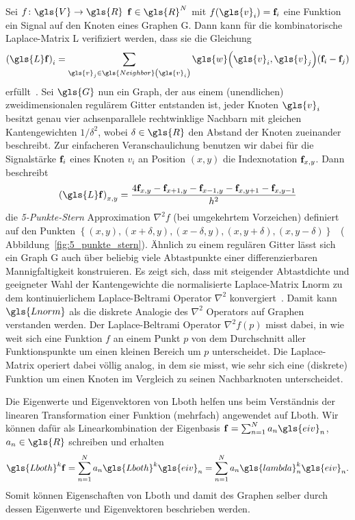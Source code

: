 Sei $f \colon \gls{V} \to \gls{R}$ \bzw{} $\ve{f} \in \gls{R}^N$ mit $f\left(\gls{v}_i\right) = \ve{f}_i$ eine Funktion \bzw{} ein Signal auf den Knoten eines Graphen \gls{G}.
Dann kann für die kombinatorische Laplace-Matrix \gls{L} verifiziert werden, dass sie die Gleichung
\begin{equation*}
  {\left(\gls{L}\ve{f}\right)}_i = \sum_{\gls{v}_j \in \gls{Neighbor}\left(\gls{v}_i\right)} \gls{w}\left(\gls{v}_i, \gls{v}_j\right) \left(\ve{f}_i - \ve{f}_j\right)
\end{equation*}
erfüllt~\cite{Hammond}.
Sei $\gls{G}$ nun ein Graph, der aus einem (unendlichen) zweidimensionalen regulärem Gitter entstanden ist, \dhe{} jeder Knoten $\gls{v}_i$ besitzt genau vier achsenparallele rechtwinklige Nachbarn mit gleichen Kantengewichten $1/\delta^2$, wobei $\delta \in \gls{R}$ den Abstand der Knoten zueinander beschreibt.
Zur einfacheren Veranschaulichung benutzen wir dabei für die Signalstärke $\mathbf{f}_i$ eines Knoten $v_i$ an Position $\left(x, y\right)$ die Indexnotation $\mathbf{f}_{x,y}$.
Dann beschreibt
\begin{equation*}
  {\left(\gls{L}\ve{f}\right)}_{x,y} = \frac{4\ve{f}_{x,y} - \ve{f}_{x+1,y} - \ve{f}_{x-1,y} - \ve{f}_{x,y+1} - \ve{f}_{x,y-1}}{h^2}
\end{equation*}
die \emph{5-Punkte-Stern} Approximation $\nabla^2 f$ (bei umgekehrtem Vorzeichen) definiert auf den Punkten $\left\{\left(x,y\right), \left(x+\delta,y\right), \left(x-\delta,y\right), \left(x,y + \delta\right),\left(x,y-\delta\right)\right\}$~\cite{Hammond} (\vgl{} Abbildung~\ref{fig:5_punkte_stern}).
Ähnlich zu einem regulären Gitter lässt sich ein Graph \gls{G} auch über beliebig viele Abtastpunkte einer differenzierbaren Mannigfaltigkeit konstruieren.
Es zeigt sich, dass mit steigender Abtastdichte und geeigneter Wahl der Kantengewichte die normalisierte Laplace-Matrix \gls{Lnorm} zu dem kontinuierlichem Laplace-Beltrami Operator $\nabla^2$ konvergiert~\cite{Hammond}.
Damit kann $\gls{Lnorm}$ als die diskrete Analogie des $\nabla^2$ Operators auf Graphen verstanden werden.
Der Laplace-Beltrami Operator $\nabla^2 f\left(p\right)$ misst dabei, in wie weit sich eine Funktion $f$ an einem Punkt $p$ von dem Durchschnitt aller Funktionspunkte um einen kleinen Bereich um $p$ unterscheidet.
Die Laplace-Matrix operiert dabei völlig analog, in dem sie misst, wie sehr sich eine (diskrete) Funktion um einen Knoten im Vergleich zu seinen Nachbarknoten unterscheidet.

Die Eigenwerte und Eigenvektoren von \gls{Lboth} helfen uns beim Verständnis der linearen Transformation einer Funktion  (mehrfach) angewendet auf \gls{Lboth}.
Wir können dafür  als Linearkombination der Eigenbasis $\ve{f} = \sum_{n=1}^N a_n \gls{eiv}_n$, $a_n \in \gls{R}$ schreiben und erhalten
\begin{equation*}
  \gls{Lboth}^k \ve{f} = \sum_{n=1}^N a_n \gls{Lboth}^k \gls{eiv}_n = \sum_{n=1}^N a_n \gls{lambda}_n^k \gls{eiv}_n.
\end{equation*}
Somit können Eigenschaften von \gls{Lboth} und damit des Graphen selber durch dessen Eigenwerte und Eigenvektoren beschrieben werden.

